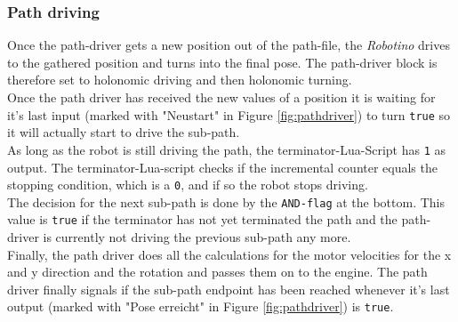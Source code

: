 \subsubsection{Path driving}
Once the path-driver gets a new position out of the path-file, the \textit{Robotino} drives to the gathered position and turns into the final pose.
The path-driver block is therefore set to holonomic driving and then holonomic turning. \\
Once the path driver has received the new values of a position it is waiting for it's last input (marked with "Neustart" in Figure \ref{fig:pathdriver}) to turn \texttt{true} so it will actually start to drive the sub-path.  \\
As long as the robot is still driving the path, the terminator-Lua-Script has \texttt{1} as output. The terminator-Lua-script checks if the incremental counter equals the stopping condition, which is a \texttt{0}, and if so the robot stops driving. \\
The decision for the next sub-path is done by the \texttt{AND-flag} at the bottom. This value is \texttt{true} if the terminator has not yet terminated the path and the path-driver is currently not driving the previous sub-path any more.\\ Finally, the path driver does all the calculations for the motor velocities for the x and y direction and the rotation and passes them on to the engine. The path driver finally signals if the sub-path endpoint has been reached whenever it's last output (marked with "Pose erreicht" in Figure \ref{fig:pathdriver}) is \texttt{true}.
